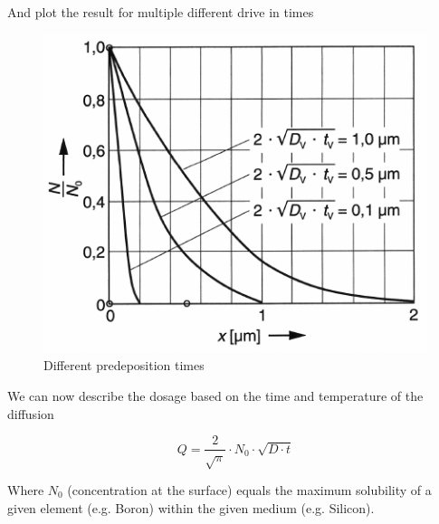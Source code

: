 And plot the result for multiple different drive in times
\begin{figure}[H]
	\centering
	\includegraphics[scale=0.5]{dopants_depth.png}
	\caption{Different predeposition times}
\end{figure}

We can now describe the dosage based on the time and temperature of the diffusion

\begin{equation}
Q=\frac{2}{\sqrt{\pi}} \cdot N_0 \cdot \sqrt{D \cdot t}
\end{equation}

Where $N_0$ (concentration at the surface) equals the maximum solubility of a given element (e.g. Boron) within the given medium (e.g. Silicon).

